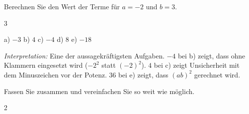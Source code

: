 \documentclass[11pt]{exam}
\newcommand{\aufgabe}[1]{%
  \needspace{8\baselineskip}%
  \renewcommand{\questionlabel}{\textbf{#1}}%
  \question}
\newcommand{\raum}[1]{\ifprintanswers\else\fillwithgrid{#1}\fi}
\newcommand{\bruchabstand}{\setlength{\itemsep}{2.5ex}}
\newcommand{\diagnose}[1]{\par\smallskip\textit{Interpretation:} #1}
\begin{document}
\begin{questions}
\aufgabe{2.5}
Berechnen Sie den Wert der Terme für $a = -2$ und $b = 3$.
\begin{multicols}{3}
\end{multicols}
\begin{solution}
  a) $-3$ \quad b) $4$ \quad c) $-4$ \quad d) $8$ \quad e) $-18$
  \diagnose{Eine der aussagekräftigsten Aufgaben. $-4$ bei b) zeigt, dass ohne
  Klammern eingesetzt wird ($-2^2$ statt $(-2)^2$). $4$ bei c) zeigt
  Unsicherheit mit dem Minuszeichen vor der Potenz. $36$ bei e) zeigt, dass
  $(ab)^2$ gerechnet wird.}
\end{solution}
\raum{3cm}

\aufgabe{3.5}
Fassen Sie zusammen und vereinfachen Sie so weit wie möglich.
\begin{multicols}{2}
\end{multicols}
\end{questions}
\end{document}
